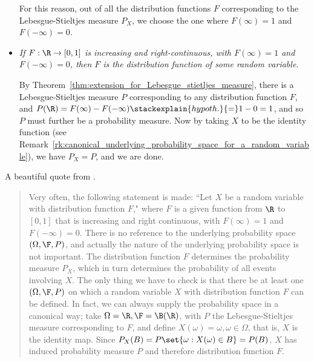 \documentclass{article} %
\begin{document}
\begin{remark}{}
\begin{itemize}
For this reason, out of all the distribution functions $F$ corresponding to the Lebesgue-Stieltjes measure $P_X$, we choose the one where $F(\infty)=1$ and $F(-\infty)=0$.
\item \textit{If $F: \R \to [0,1]$ is increasing and right-continuous, with $F(\infty)=1$ and $F(-\infty)=0$, then $F$ is the distribution function of some random variable.}

By Theorem~\ref{thm:extension_for_Lebesgue_stietljes_measure}, there is a Lebesgue-Stieltjes measure $P$ corresponding to any distribution function $F$,  and $P(\R) = F(\infty) - F(-\infty) \stackexplain{hypoth.}{=} 1 - 0 = 1$, and so $P$ must further be a probability measure.   Now by taking $X$ to be the identity function (see Remark~\ref{rk:canonical_underlying_probability_space_for_a_random_variable}), we have $P_X =P$, and we are done.  
\end{itemize}
\label{rk:correspondence_between_distribution_functions_of_random_variables_and_probability_measures_induced_by_random_variables}
\end{remark}


\begin{remark}{} 

A beautiful quote from \cite[pp.174]{ash2000probability}.

\begin{quotation}
Very often, the following statement is made: ``Let $X$ be a random variable with distribution function $F$," where $F$ is a given function from $\R$ to $[0,1]$ that is increasing and right continuous, with $F(\infty)=1$ and $F(-\infty)=0$.  There is no reference to the underlying probability space $(\Omega, \F, P)$, and actually the nature of the underlying probability space is not important.  The distribution function $F$ determines the probability measure $P_X$, which in turn determines the probability of all events involving $X$.  The only thing we have to check is that there be at least one $(\Omega, \F, P)$ on which a random variable $X$ with distribution function $F$ can be defined.  In fact, we can always supply the probability space in a canonical way; take $\Omega = \R, \F = \B(\R)$, with $P$ the Lebesgue-Stieltjes measure corresponding to $F$, and define $X(\omega) = \omega, \omega \in \Omega$, that is, $X$ is the identity map.   Since $P_X(B) = P\set{\omega: X(\omega) \in B}=P(B)$, $X$ has induced probability measure $P$ and therefore distribution function $F$.
\end{quotation}
\label{rk:canonical_underlying_probability_space_for_a_random_variable}
\end{remark}
\end{document}
